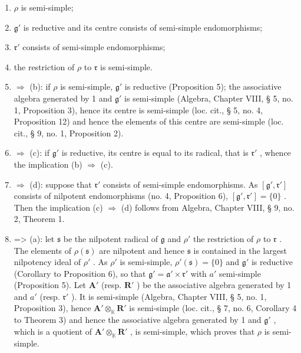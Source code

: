 \begin{enumerate}
\def\labelenumi{(\alph{enumi})}
\item
  \(\rho\) is semi-simple;
\item
  \(\mathfrak{g}'\) is reductive and its centre consists of semi-simple endomorphisms;
\item
  \(\mathfrak{r}'\) consists of semi-simple endomorphisms;
\item
  the restriction of \(\rho\) to \(\mathfrak{r}\) is semi-simple.
\item
  \(\Rightarrow\) (b): if \(\rho\) is semi-simple, \(\mathfrak{g}'\) is reductive (Proposition 5); the associative algebra generated by 1 and \(\mathfrak{g}'\) is semi-simple (Algebra, Chapter VIII, § 5, no. 1, Proposition 3), hence its centre is semi-simple (loc. cit., § 5, no. 4, Proposition 12) and hence the elements of this centre are semi-simple (loc. cit., § 9, no. 1, Proposition 2).
\item
  \(\Rightarrow\) (c): if \(\mathfrak{g}'\) is reductive, its centre is equal to its radical, that is \(\mathfrak{r}'\) , whence the implication (b) \(\Rightarrow\) (c).
\item
  \(\Rightarrow\) (d): suppose that \(\mathfrak{r}'\) consists of semi-simple endomorphisms. As \([\mathfrak{g}',\mathfrak{r}']\) consists of nilpotent endomorphisms (no. 4, Proposition 6), \([\mathfrak{g}',\mathfrak{r}'] = \{0\}\) . Then the implication (c) \(\Rightarrow\) (d) follows from Algebra, Chapter VIII, § 9, no. 2, Theorem 1.
\item
  =\textgreater{} (a): let \(\mathfrak{s}\) be the nilpotent radical of \(\mathfrak{g}\) and \(\rho'\) the restriction of \(\rho\) to \(\mathfrak{r}\) . The elements of \(\rho(\mathfrak{s})\) are nilpotent and hence \(\mathfrak{s}\) is contained in the largest nilpotency ideal of \(\rho'\) . As \(\rho'\) is semi-simple, \(\rho'(\mathfrak{s}) = \{0\}\) and \(\mathfrak{g}'\) is reductive (Corollary to Proposition 6), so that \(\mathfrak{g}' = \mathfrak{a}' \times \mathfrak{r}'\) with \(a'\) semi-simple (Proposition 5). Let \(\mathbf{A}'\) (resp. \(\mathbf{R}'\) ) be the associative algebra generated by 1 and \(a'\) (resp. \(\mathfrak{r}'\) ). It is semi-simple (Algebra, Chapter VIII, § 5, no. 1, Proposition 3), hence \(\mathbf{A}' \otimes_{\mathbb{K}} \mathbf{R}'\) is semi-simple (loc. cit., § 7, no. 6, Corollary 4 to Theorem 3) and hence the associative algebra generated by 1 and \(\mathfrak{g}'\) , which is a quotient of \(\mathbf{A}' \otimes_{\mathbb{K}} \mathbf{R}'\) , is semi-simple, which proves that \(\rho\) is semi-simple.
\end{enumerate}

